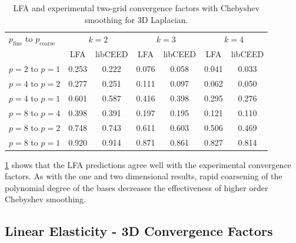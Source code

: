 \documentclass[review]{siamart190516}
\begin{document}
\begin{table}[ht!]
\begin{center}
\begin{tabular}{l cc cc cc}
  \toprule
  $p_{\text{fine}}$ to $p_{\text{coarse}}$  &  \multicolumn{2}{c}{$k = 2$}  &  \multicolumn{2}{c}{$k = 3$}  &  \multicolumn{2}{c}{$k = 4$}  \\
                      &  LFA  &  libCEED  &  LFA  &  libCEED  &  LFA  &  libCEED  \\
  \toprule
  $p = 2$ to $p = 1$  &  0.253 & 0.222  &  0.076 & 0.058  &  0.041 & 0.033  \\
  \midrule
  $p = 4$ to $p = 2$  &  0.277 & 0.251  &  0.111 & 0.097  &  0.062 & 0.050  \\
  $p = 4$ to $p = 1$  &  0.601 & 0.587  &  0.416 & 0.398  &  0.295 & 0.276  \\
  \midrule
  $p = 8$ to $p = 4$  &  0.398 & 0.391  &  0.197 & 0.195  &  0.121 & 0.110  \\
  $p = 8$ to $p = 2$  &  0.748 & 0.743  &  0.611 & 0.603  &  0.506 & 0.469  \\
  $p = 8$ to $p = 1$  &  0.920 & 0.914  &  0.871 & 0.861  &  0.827 & 0.814  \\
  \bottomrule
\end{tabular}
\end{center}
\caption{LFA and experimental two-grid convergence factors with Chebyshev smoothing for 3D Laplacian.}
\label{table:two_grid_3d_chebyshev}
\end{table}

\cref{table:two_grid_3d_chebyshev} shows that the LFA predictions agree well with the experimental convergence factors.
As with the one and two dimensional results, rapid coarsening of the polynomial degree of the bases decreases the effectiveness of higher order Chebyshev smoothing.

\subsection{Linear Elasticity - 3D Convergence Factors}\label{sec:solidsresults}
\end{document}
